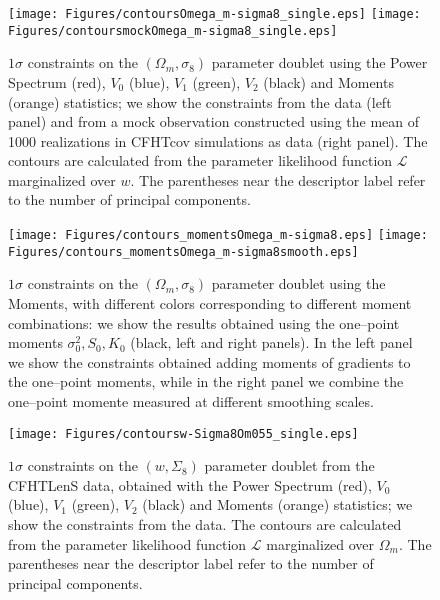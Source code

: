 \documentclass[reprint,aps,prd,superscriptaddress,showkeys,showpacs]{revtex4-1}
\begin{document}
\begin{figure*}
\begin{center}
\texttt{[image: Figures/contoursOmega\_m-sigma8\_single.eps]}
\texttt{[image: Figures/contoursmockOmega\_m-sigma8\_single.eps]}
\end{center}
\caption{$1\sigma$ constraints on the $(\Omega_m,\sigma_8)$ parameter doublet using the Power Spectrum (red), $V_0$ (blue), $V_1$ (green), $V_2$ (black) and Moments (orange) statistics; we show the constraints from the data (left panel) and from a mock observation constructed using the mean of 1000 realizations in CFHTcov simulations as data (right panel). The contours are calculated from the parameter likelihood function $\mathcal{L}$ marginalized over $w$. The parentheses near the descriptor label refer to the number of principal components.}
\label{contours3single}
\end{figure*}

\begin{figure*}
\begin{center}
\texttt{[image: Figures/contours\_momentsOmega\_m-sigma8.eps]}
\texttt{[image: Figures/contours\_momentsOmega\_m-sigma8smooth.eps]}
\end{center}
\caption{$1\sigma$ constraints on the $(\Omega_m,\sigma_8)$ parameter doublet using the Moments, with different colors corresponding to different moment combinations: we show the results obtained using the one--point moments $\sigma_0^2,S_0,K_0$ (black, left and right panels). In the left panel we show the constraints obtained adding moments of gradients to the one--point moments, while in the right panel we combine the one--point momente measured at different smoothing scales.}
\label{contoursMoments}
\end{figure*}

\begin{figure}
\begin{center}
\texttt{[image: Figures/contoursw-Sigma8Om055\_single.eps]}
\end{center}
\caption{$1\sigma$ constraints on the $(w,\Sigma_8)$ parameter doublet from the CFHTLenS data, obtained with the Power Spectrum (red), $V_0$ (blue), $V_1$ (green), $V_2$ (black) and Moments (orange) statistics; we show the constraints from the data. The contours are calculated from the parameter likelihood function $\mathcal{L}$ marginalized over $\Omega_m$. The parentheses near the descriptor label refer to the number of principal components.}
\label{contours3singleRep}
\end{figure}
\end{document}
